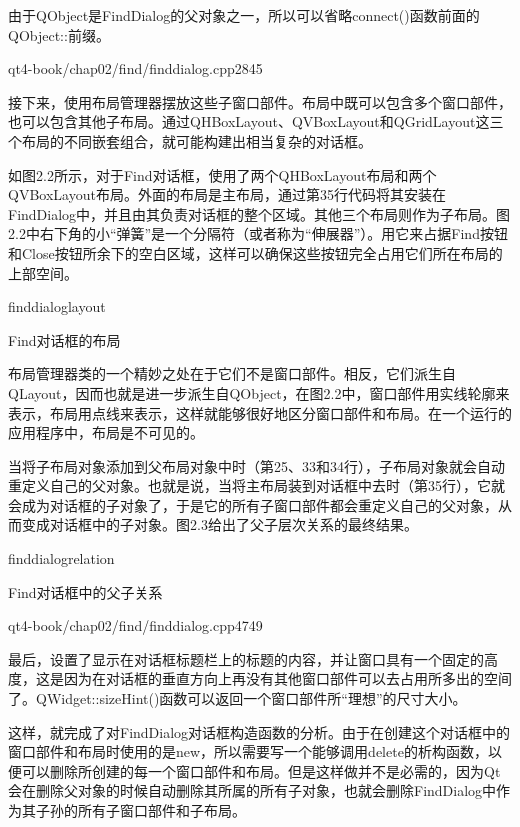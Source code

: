 \documentclass[11pt,oneside]{book}
\begin{document}
\begin{common-format}
由于QObject是FindDialog的父对象之一，所以可以省略connect()函数前面的QObject::前缀。

\begin{cppline}[21]{qt4-book/chap02/find/finddialog.cpp}{28}{45}
\end{cppline}

接下来，使用布局管理器摆放这些子窗口部件。布局中既可以包含多个窗口部件，也可以包含其他子布局。通过QHBoxLayout、QVBoxLayout和QGridLayout这三个布局的不同嵌套组合，就可能构建出相当复杂的对话框。

如图2.2所示，对于Find对话框，使用了两个QHBoxLayout布局和两个QVBoxLayout布局。外面的布局是主布局，通过第35行代码将其安装在FindDialog中，并且由其负责对话框的整个区域。其他三个布局则作为子布局。图2.2中右下角的小“弹簧”是一个分隔符（或者称为“伸展器”）。用它来占据Find按钮和Close按钮所余下的空白区域，这样可以确保这些按钮完全占用它们所在布局的上部空间。

\begin{linefig}[0.8]{finddialoglayout}
\caption{Find对话框的布局}
\label{fig:finddialoglayout}
\end{linefig}

布局管理器类的一个精妙之处在于它们不是窗口部件。相反，它们派生自QLayout，因而也就是进一步派生自QObject，在图2.2中，窗口部件用实线轮廓来表示，布局用点线来表示，这样就能够很好地区分窗口部件和布局。在一个运行的应用程序中，布局是不可见的。

当将子布局对象添加到父布局对象中时（第25、33和34行），子布局对象就会自动重定义自己的父对象。也就是说，当将主布局装到对话框中去时（第35行），它就会成为对话框的子对象了，于是它的所有子窗口部件都会重定义自己的父对象，从而变成对话框中的子对象。图2.3给出了父子层次关系的最终结果。

\begin{fig}[0.8]{finddialogrelation}
\caption{Find对话框中的父子关系}
\label{fig:finddialogrelation}
\end{fig}

\begin{cppline}[36]{qt4-book/chap02/find/finddialog.cpp}{47}{49}
\end{cppline}

最后，设置了显示在对话框标题栏上的标题的内容，并让窗口具有一个固定的高度，这是因为在对话框的垂直方向上再没有其他窗口部件可以去占用所多出的空间了。QWidget::sizeHint()函数可以返回一个窗口部件所“理想”的尺寸大小。

这样，就完成了对FindDialog对话框构造函数的分析。由于在创建这个对话框中的窗口部件和布局时使用的是new，所以需要写一个能够调用delete的析构函数，以便可以删除所创建的每一个窗口部件和布局。但是这样做并不是必需的，因为Qt会在删除父对象的时候自动删除其所属的所有子对象，也就会删除FindDialog中作为其子孙的所有子窗口部件和子布局。


\end{common-format}
\end{document}
